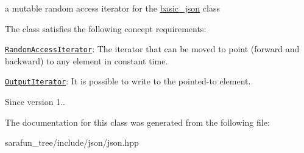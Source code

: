 a mutable random access iterator for the \hyperlink{classnlohmann_1_1basic__json}{basic\-\_\-json} class 

The class satisfies the following concept requirements\-:
\begin{DoxyItemize}
\item \href{http://en.cppreference.com/w/cpp/concept/RandomAccessIterator}{\tt Random\-Access\-Iterator}\-: The iterator that can be moved to point (forward and backward) to any element in constant time.
\item \href{http://en.cppreference.com/w/cpp/concept/OutputIterator}{\tt Output\-Iterator}\-: It is possible to write to the pointed-\/to element.
\end{DoxyItemize}

\begin{DoxySince}{Since}
version 1.. 
\end{DoxySince}


The documentation for this class was generated from the following file\-:\begin{DoxyCompactItemize}
\item 
sarafun\-\_\-tree/include/json/json.\-hpp\end{DoxyCompactItemize}
